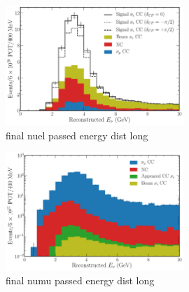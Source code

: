 \begin{figure} %
    \includegraphics[width=0.6\textwidth]{diagrams/7-cvn/chipsnet/final_nuel_passed_energy_dist.pdf}
    \caption[final nuel passed energy dist short]
    {final nuel passed energy dist long}
    \label{fig:final_nuel_passed_energy_dist}
\end{figure}

\begin{figure} %
    \includegraphics[width=0.6\textwidth]{diagrams/7-cvn/chipsnet/final_numu_passed_energy_dist.pdf}
    \caption[final numu passed energy dist short]
    {final numu passed energy dist long}
    \label{fig:final_numu_passed_energy_dist}
\end{figure}

